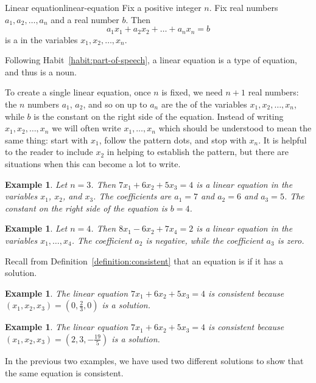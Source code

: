 \documentclass{book}
\newcounter{ekcounter}%
\theoremstyle{ekimcustom}
\newtheorem{example}[ekcounter]{Example}
\newcommand\defn[1]{{\color{blue}{\bf #1}}}
\begin{document}
\begin{bdefinition}{Linear equation}{linear-equation}
Fix a positive integer $n$. Fix real numbers $a_1,a_2,\dots,a_n$ and a real number $b$. Then
\[ a_1x_1 + a_2x_2 + \dots + a_nx_n = b\]
is a \defn{linear equation} in the variables $x_1,x_2,\dots,x_n$.
\end{bdefinition}
Following Habit~\ref{habit:part-of-speech}, a linear equation is a type of equation, and thus is a noun.

To create a single linear equation, once $n$ is fixed, we need $n+1$ real numbers: the $n$ numbers $a_1$, $a_2$, and so on up to $a_n$ are the \defn{coefficients} of the variables $x_1,x_2,\dots,x_n$, while $b$ is the constant on the right side of the equation. Instead of writing $x_1,x_2,\dots,x_n$ we will often write $x_1,\dots,x_n$ which should be understood to mean the same thing: start with $x_1$, follow the pattern dots, and stop with $x_n$. It is helpful to the reader to include $x_2$ in helping to establish the pattern, but there are situations when this can become a lot to write.
\begin{example}
Let $n=3$. Then $7x_1 + 6x_2 +5x_3 = 4$ is a linear equation in the variables $x_1$, $x_2$, and $x_3$. The coefficients are $a_1=7$ and $a_2=6$ and $a_3=5$. The constant on the right side of the equation is $b=4$.
\end{example}
\begin{example}
Let $n=4$. Then $8x_1 - 6x_2 + 7x_{4} = 2$ is a linear equation in the variables $x_1,\dots,x_4$. The coefficient $a_2$ is negative, while the coefficient $a_3$ is zero.
\end{example}

Recall from Definition~\ref{definition:consistent} that an equation is \defn{consistent} if it has a solution.
\begin{example}
The linear equation $7x_1 + 6x_2 +5x_3 = 4$ is consistent because $(x_1,x_2,x_3)=(0,\frac23,0)$ is a solution.
\end{example}
\begin{example}
The linear equation $7x_1 + 6x_2 +5x_3 = 4$ is consistent because $(x_1,x_2,x_3)=(2,3,-\frac{19}{5})$ is a solution.
\end{example}
In the previous two examples, we have used two different solutions to show that the same equation is consistent.
\end{document}
